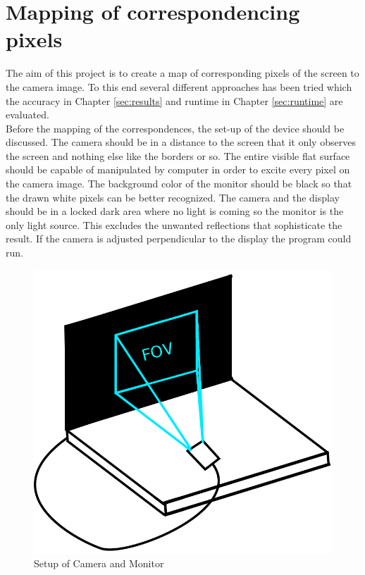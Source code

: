 \documentclass[journal,final,a4paper,twoside]{PS}
\begin{document}
\section{Mapping of correspondencing pixels}
\label{sec:mapping}
The aim of this project is to create a map of corresponding pixels of the screen to the camera image. To this end several different approaches has been tried which the accuracy in Chapter \ref{sec:results} and runtime in Chapter \ref{sec:runtime} are evaluated. \\
Before the mapping of the correspondences, the set-up of the device should be discussed. The camera should be in a distance to the screen that it only observes the screen and nothing else like the borders or so. The entire visible flat surface should be capable of manipulated by computer in order to excite every pixel on the camera image. The background color of the monitor should be black so that the drawn white pixels can be better recognized. The camera and the display should be in a locked dark area where no light is coming so the monitor is the only light source. This excludes the unwanted reflections that sophisticate the result. If the camera is adjusted perpendicular to the display the program could run.
\begin{figure}[h]
\begin{center}
\includegraphics[scale=0.18]{./pics/setup.png}
\caption{Setup of Camera and Monitor}
\label{fig:setup}
\end{center}
\end{figure}\\
\end{document}
